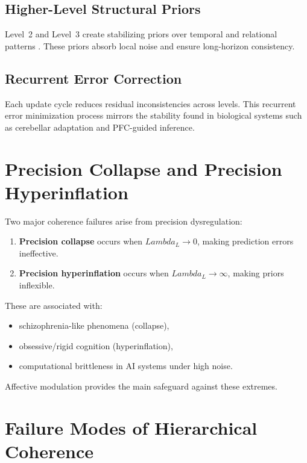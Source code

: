\documentclass[12pt,oneside]{book}
\theoremstyle{plain}
\theoremstyle{definition}
\let\citep\parencite
\def\Lambda{Lambda}%
\begin{document}
\subsection{Higher-Level Structural Priors}

Level~2 and Level~3 create stabilizing priors over temporal and relational
patterns \citep{dehaene2014consciousness,friston2010freeenergy}.
These priors absorb local noise and ensure long-horizon consistency.

\subsection{Recurrent Error Correction}

Each update cycle reduces residual inconsistencies across levels.
This recurrent error minimization process mirrors the stability found in
biological systems such as cerebellar adaptation and PFC-guided inference.

\section{Precision Collapse and Precision Hyperinflation}

Two major coherence failures arise from precision dysregulation:

\begin{enumerate}
    \item \textbf{Precision collapse}
    occurs when $\Lambda_L \rightarrow 0$, making prediction errors ineffective.

    \item \textbf{Precision hyperinflation}
    occurs when $\Lambda_L \rightarrow \infty$, making priors inflexible.
\end{enumerate}

These are associated with:

\begin{itemize}
    \item schizophrenia-like phenomena (collapse),
    \item obsessive/rigid cognition (hyperinflation),
    \item computational brittleness in AI systems under high noise.
\end{itemize}

Affective modulation provides the main safeguard against these extremes.

\section{Failure Modes of Hierarchical Coherence}
\end{document}
